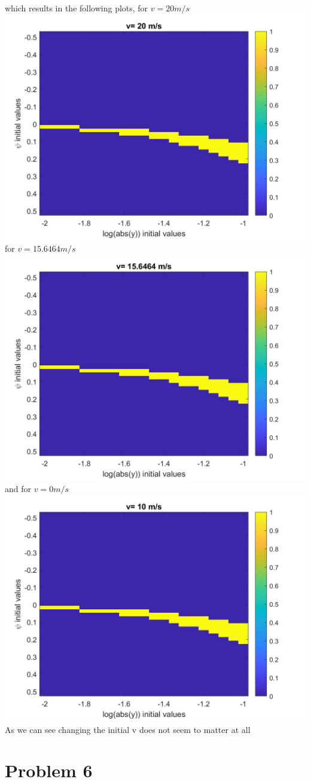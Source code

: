 \documentclass[12pt]{article}
\begin{document}
which results in the following plots, for $v=20m/s$\\
\includegraphics[scale=0.4]{Problem5v20.jpg}\\
for $v=15.6464m/s$\\
\includegraphics[scale=0.4]{Problem5v15.jpg}\\
and for $v=0m/s$\\
\includegraphics[scale=0.4]{Problem5v0.jpg}\\
As we can see changing the initial v does not seem to matter at all\\


\section*{Problem 6}
\end{document}
